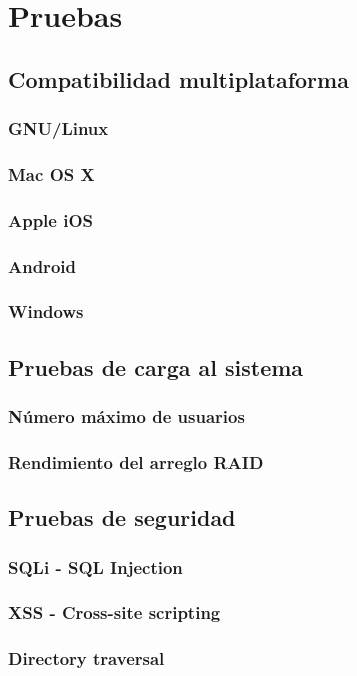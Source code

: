   \label{chap:cap4}
  \chapter {Pruebas}
    \section {Compatibilidad multiplataforma}
      \subsection {GNU/Linux}
      \subsection {Mac OS X}
      \subsection {Apple iOS}
      \subsection {Android}
      \subsection {Windows}
    \section {Pruebas de carga al sistema}
      \subsection {N\'{u}mero m\'{a}ximo de usuarios}
      \subsection {Rendimiento del arreglo RAID}
    \section {Pruebas de seguridad}
      \subsection {SQLi - SQL Injection}
      \subsection {XSS - Cross-site scripting}
      \subsection {Directory traversal}
